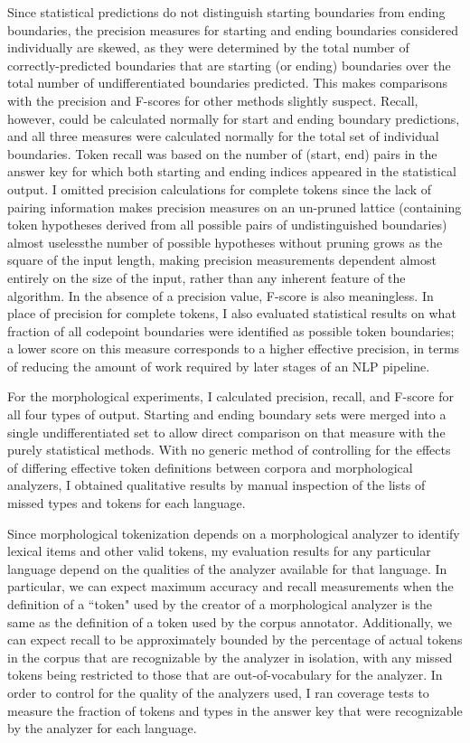 Since statistical predictions do not distinguish starting boundaries from ending boundaries, the precision measures for starting and ending boundaries considered individually are skewed, as they were determined by the total number of correctly-predicted boundaries that are starting (or ending) boundaries over the total number of undifferentiated boundaries predicted. This makes comparisons with the precision and F-scores for other methods slightly suspect. Recall, however, could be calculated normally for start and ending boundary predictions, and all three measures were calculated normally for the total set of individual boundaries. Token recall was based on the number of (start, end) pairs in the answer key for which both starting and ending indices appeared in the statistical output. I omitted precision calculations for complete tokens since the lack of pairing information makes precision measures on an un-pruned lattice (containing token hypotheses derived from all possible pairs of undistinguished boundaries) almost useless\textemdash the number of possible hypotheses without pruning grows as the square of the input length, making precision measurements dependent almost entirely on the size of the input, rather than any inherent feature of the algorithm. In the absence of a precision value, F-score is also meaningless. In place of precision for complete tokens, I also evaluated statistical results on what fraction of all codepoint boundaries were identified as possible token boundaries; a lower score on this measure corresponds to a higher effective precision, in terms of reducing the amount of work required by later stages of an NLP pipeline.

For the morphological experiments, I calculated precision, recall, and F-score for all four types of output. Starting and ending boundary sets were merged into a single undifferentiated set to allow direct comparison on that measure with the purely statistical methods. With no generic method of controlling for the effects of differing effective token definitions between corpora and morphological analyzers, I obtained qualitative results by manual inspection of the lists of missed types and tokens for each language.

Since morphological tokenization depends on a morphological analyzer to identify lexical items and other valid tokens, my evaluation results for any particular language depend on the qualities of the analyzer available for that language. In particular, we can expect maximum accuracy and recall measurements when the definition of a ``token" used by the creator of a morphological analyzer is the same as the definition of a token used by the corpus annotator. Additionally, we can expect recall to be approximately bounded by the percentage of actual tokens in the corpus that are recognizable by the analyzer in isolation, with any missed tokens being restricted to those that are out-of-vocabulary for the analyzer.
In order to control for the quality of the analyzers used, I ran coverage tests to measure the fraction of tokens and types in the answer key that were recognizable by the analyzer for each language.

